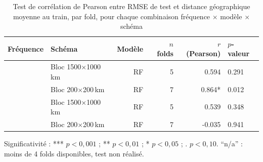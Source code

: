 \begin{table}[htbp]
\centering
\caption{Test de corr\'elation de Pearson entre RMSE de test et distance g\'eographique moyenne au train, par fold, pour chaque combinaison fr\'equence $\times$ mod\`ele $\times$ sch\'ema}
\label{tab:distance_significance}
\small
\begin{tabular}{llrrrl}
\toprule
Fr\'equence & Sch\'ema & Mod\`ele & $n$ folds & $r$ (Pearson) & $p$-valeur \\
\midrule
 & Bloc 1500$\times$1000\,km & RF & 5 & 0.594 & 0.291 \\
 & Bloc 200$\times$200\,km & RF & 7 & 0.864* & 0.012 \\
\midrule
 & Bloc 1500$\times$1000\,km & RF & 5 & 0.539 & 0.348 \\
 & Bloc 200$\times$200\,km & RF & 7 & -0.035 & 0.941 \\
\bottomrule
\end{tabular}
\vspace{0.3em}
{\footnotesize Significativit\'e : *** $p<0{,}001$ ; ** $p<0{,}01$ ; * $p<0{,}05$ ; . $p<0{,}10$. ``n/a'' : moins de 4 folds disponibles, test non r\'ealis\'e.}
\end{table}
